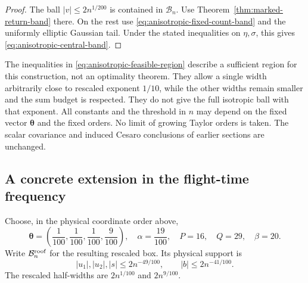 \begin{proof}
The ball $|v|\le2n^{1/200}$ is contained in $\mathcal B_n$.
Use Theorem~\ref{thm:marked-return-band} there. On the rest use
\eqref{eq:anisotropic-fixed-count-band} and the uniformly elliptic
Gaussian tail. Under the stated inequalities on $\eta,\sigma$,
this gives \eqref{eq:anisotropic-central-band}.
\end{proof}

\begin{remark}
The inequalities in \eqref{eq:anisotropic-feasible-region} describe a
sufficient region for this construction, not an optimality theorem.
They allow a single width arbitrarily close to rescaled exponent
$1/10$, while the other widths remain smaller and the sum budget is
respected. They do not give the full isotropic ball with that exponent.
All constants and the threshold in $n$ may depend on the fixed vector
$\boldsymbol\theta$ and the fixed orders. No limit of growing Taylor
orders is taken. The scalar covariance and induced Cesaro conclusions
of earlier sections are unchanged.
\end{remark}

\subsection{A concrete extension in the flight-time frequency}
Choose, in the physical coordinate order above,
\begin{equation}\label{eq:roof-box-concrete-scales}
 \boldsymbol\theta=\left(\frac1{100},\frac1{100},
                              \frac1{100},\frac9{100}\right),
 \quad \alpha=\frac{19}{100},\quad P=16,\quad Q=29,\quad\beta=20.
\end{equation}
Write $\mathcal B_n^{\rm roof}$ for the resulting rescaled box.
Its physical support is
\begin{equation}\label{eq:roof-box-physical-support}
 |u_1|,|u_2|,|s|\le2n^{-49/100},\qquad |b|\le2n^{-41/100}.
\end{equation}
The rescaled half-widths are $2n^{1/100}$ and $2n^{9/100}$.

